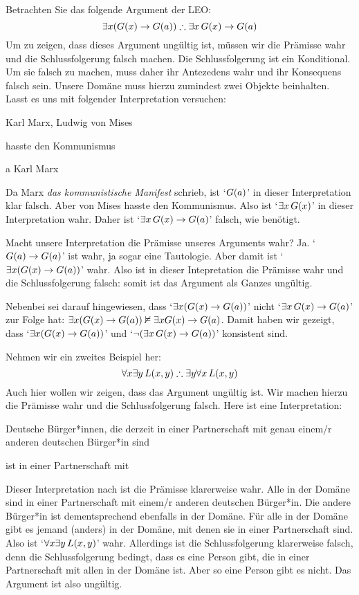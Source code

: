 Betrachten Sie das folgende Argument der LEO:
$$\exists x(\atom{G}{x} \eif \atom{G}{a}) \therefore \exists x\, \atom{G}{x} \eif \atom{G}{a}$$
Um zu zeigen, dass dieses Argument ungültig ist, müssen wir die Prämisse wahr und die Schlussfolgerung falsch machen. Die Schlussfolgerung ist ein Konditional. Um sie falsch zu machen, muss daher ihr Antezedens wahr und ihr Konsequens falsch sein. Unsere Domäne muss hierzu zumindest zwei Objekte beinhalten. Lasst es uns mit folgender Interpretation versuchen:
	\begin{ekey}
		\item[\text{Domäne}] Karl Marx, Ludwig von Mises
		\item[\atom{G}{x}]  hasste den Kommunismus
		\item[a] Karl Marx
	\end{ekey}
Da Marx \emph{das kommunistische Manifest} schrieb, ist `$\mathord{G}(a)$' in dieser Interpretation klar falsch. Aber von Mises hasste den Kommunismus. Also ist `$\exists x\, \mathord{G}(x)$' in dieser Interpretation wahr. Daher ist `$\exists x\, \mathord{G}(x) \rightarrow \mathord{G}(a)$' falsch, wie benötigt. 

Macht unsere Interpretation die Prämisse unseres Arguments wahr? Ja. `$\mathord{G}(a) \rightarrow \mathord{G}(a)$' ist wahr, ja sogar eine Tautologie. Aber damit ist `$\exists x (\mathord{G}(x) \rightarrow \mathord{G}(a))$' wahr. Also ist in dieser Intepretation die Prämisse wahr und die Schlussfolgerung falsch: somit ist das Argument als Ganzes ungültig.

Nebenbei sei darauf hingewiesen, dass `$\exists x(\mathord{G}(x) \rightarrow \mathord{G}(a))$' nicht `$\exists x\, \mathord{G}(x) \rightarrow \mathord{G}(a)$' zur Folge hat: $\exists x (\mathord{G}(x) \rightarrow \mathord{G}(a)) \nvDash \exists x \mathord{G}(x) \rightarrow \mathord{G}(a)$. Damit haben wir gezeigt, dass `$\exists x (\mathord{G}(x) \rightarrow \mathord{G}(a))$' und `$\neg (\exists x\, \mathord{G}(x) \rightarrow \mathord{G}(a))$' konsistent sind.

Nehmen wir ein zweites Beispiel her:
$$\forall x \exists y\, \atom{L}{x,y} \therefore \exists y \forall x\, \atom{L}{x,y}$$
Auch hier wollen wir zeigen, dass das Argument ungültig ist. Wir machen hierzu die Prämisse wahr und die Schlussfolgerung falsch. Here ist eine Interpretation:
\begin{ekey}
	\item[\text{Domäne}] Deutsche Bürger*innen, die derzeit in einer Partnerschaft mit genau einem/r anderen deutschen Bürger*in sind
	\item[\atom{L}{x,y}]  ist in einer Partnerschaft mit \gap{y}
\end{ekey}
Dieser Interpretation nach ist die Prämisse klarerweise wahr. Alle in der Domäne sind in einer Partnerschaft mit einem/r anderen deutschen Bürger*in. Die andere Bürger*in ist dementsprechend ebenfalls in der Domäne. Für alle in der Domäne gibt es jemand (anders) in der Domäne, mit denen sie in einer Partnerschaft sind. Also ist `$\forall x \exists y\, \mathord{L}(x,y)$' wahr. Allerdings ist die Schlussfolgerung klarerweise falsch, denn die Schlussfolgerung bedingt, dass es eine Person gibt, die in einer Partnerschaft mit allen in der Domäne ist. Aber so eine Person gibt es nicht. Das Argument ist also ungültig. 

